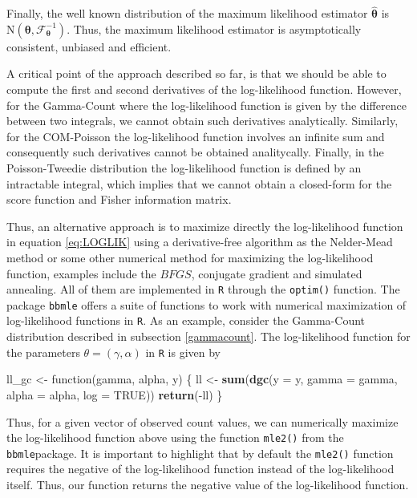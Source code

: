 \documentclass[9pt,a5paper,]{book}
\newenvironment{Shaded}{}{}
\newcommand{\KeywordTok}[1]{\textbf{{#1}}}
\newcommand{\DataTypeTok}[1]{\underline{{#1}}}
\newcommand{\StringTok}[1]{{#1}}
\newcommand{\OtherTok}[1]{{#1}}
\newcommand{\NormalTok}[1]{{#1}}
\renewenvironment{Shaded}{\color{inputcolor}}{}
\renewcommand{\DataTypeTok}[1]{{#1}}
\theoremstyle{definition}
\theoremstyle{definition}
\theoremstyle{remark}
\begin{document}
Finally, the well known distribution of the maximum likelihood estimator
\(\boldsymbol{\hat{\theta}}\) is
\(\mathrm{N}(\boldsymbol{\theta}, \mathcal{F}_{\boldsymbol{\theta}}^{-1})\).
Thus, the maximum likelihood estimator is asymptotically consistent,
unbiased and efficient.

A critical point of the approach described so far, is that we should be
able to compute the first and second derivatives of the log-likelihood
function. However, for the Gamma-Count where the log-likelihood function
is given by the difference between two integrals, we cannot obtain such
derivatives analytically. Similarly, for the COM-Poisson the
log-likelihood function involves an infinite sum and consequently such
derivatives cannot be obtained analitycally. Finally, in the
Poisson-Tweedie distribution the log-likelihood function is defined by
an intractable integral, which implies that we cannot obtain a
closed-form for the score function and Fisher information matrix.

Thus, an alternative approach is to maximize directly the log-likelihood
function in equation \eqref{eq:LOGLIK} using a derivative-free algorithm
as the Nelder-Mead method \citep{Nelder:1965} or some other numerical
method for maximizing the log-likelihood function, examples include the
\(BFGS\), conjugate gradient and simulated annealing. All of them are
implemented in \texttt{R} through the \texttt{optim()} function. The
package \texttt{bbmle} \citep{bbmle:2014} offers a suite of functions to
work with numerical maximization of log-likelihood functions in
\texttt{R}. As an example, consider the Gamma-Count distribution
described in subsection \ref{gammacount}. The log-likelihood function
for the parameters \(\theta = (\gamma, \alpha)\) in \texttt{R} is given
by

\begin{Shaded}
\begin{Highlighting}[]
\NormalTok{ll_gc <-}\StringTok{ }\NormalTok{function(gamma, alpha, y) \{}
  \NormalTok{ll <-}\StringTok{ }\KeywordTok{sum}\NormalTok{(}\KeywordTok{dgc}\NormalTok{(}\DataTypeTok{y =} \NormalTok{y, }\DataTypeTok{gamma =} \NormalTok{gamma, }\DataTypeTok{alpha =} \NormalTok{alpha, }\DataTypeTok{log =} \OtherTok{TRUE}\NormalTok{))}
  \KeywordTok{return}\NormalTok{(-ll)}
\NormalTok{\}}
\end{Highlighting}
\end{Shaded}

Thus, for a given vector of observed count values, we can numerically
maximize the log-likelihood function above using the function
\texttt{mle2()} from the \texttt{bbmle}package. It is important to
highlight that by default the \texttt{mle2()} function requires the
negative of the log-likelihood function instead of the log-likelihood
itself. Thus, our function returns the negative value of the
log-likelihood function.
\end{document}
